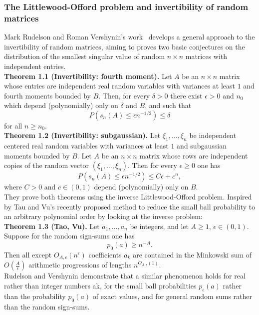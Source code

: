 \subsubsection{The Littlewood-Offord problem and invertibility of random matrices}

Mark Rudelson and Roman Vershynin's work~\cite{rudelson2008littlewood} develops a general approach to the invertibility of random matrices, aiming to proves two basic conjectures on the distribution of the smallest singular value of random \(n \times n\) matrices with independent entries.\\

\textbf{Theorem 1.1 (Invertibility: fourth moment).} Let \(A\) be an \(n \times n\) matrix whose entries are independent real random variables with variances at least \(1\) and fourth moments bounded by \(B\). Then, for every \(\delta > 0\) there exist \(\epsilon > 0\) and \(n_0\) which depend (polynomially) only on \(\delta\) and \(B\), and such that
\[P(s_n(A) \leq \epsilon n^{-1/2}) \leq \delta\] for all \(n \geq n_0\).\\

\textbf{Theorem 1.2 (Invertibility: subgaussian).} Let \(\xi_1, \ldots, \xi_n\) be independent centered real random variables with variances at least \(1\) and subgaussian moments bounded by \(B\). Let \(A\) be an \(n \times n\) matrix whose rows are independent copies of the random vector \((\xi_1, \ldots, \xi_n)\). Then for every \(\epsilon \geq 0\) one has
\[P(s_n(A) \leq \epsilon n^{-1/2}) \leq C\epsilon + c^n,\] where \(C > 0\) and \(c \in (0, 1)\) depend (polynomially) only on \(B\).\\

They prove both theorems using the inverse Littlewood-Offord problem. Inspired by Tau and Vu's recently proposed method to reduce the small ball probability to an arbitrary polynomial order by looking at the inverse problem:\\

\textbf{Theorem 1.3 (Tao, Vu).} Let \(a_1, \ldots, a_n\) be integers, and let \(A \geq 1\), \(\epsilon \in (0, 1)\). Suppose for the random sign-sums one has
\[p_0(a) \geq n^{-A}.\]
Then all except \(O_{A,\epsilon}(n^{\epsilon})\) coefficients \(a_k\) are contained in the Minkowski sum of \(O\left(\frac{A}{\epsilon}\right)\) arithmetic progressions of lengths \(n^{O_{A,\epsilon}(1)}\).\\

Rudelson and Vershynin demonstrate that a similar phenomenon holds for real rather than integer numbers ak, for the small ball probabilities \(p_{\epsilon}(a)\) rather than the probability \(p_{0}(a)\) of exact values, and for general random sums rather than the random sign-sums.\\


